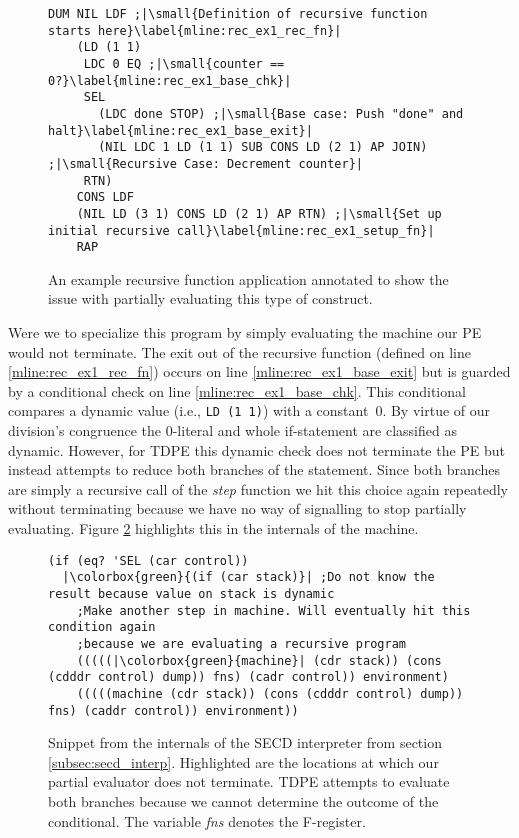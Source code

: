 \documentclass[a4paper,12pt,twoside,openright]{report}
\theoremstyle{definition}
\begin{document}
\begin{figure}[ht]
\begin{verbatim}
DUM NIL LDF ;|\small{Definition of recursive function starts here}\label{mline:rec_ex1_rec_fn}|
    (LD (1 1)
     LDC 0 EQ ;|\small{counter == 0?}\label{mline:rec_ex1_base_chk}|
     SEL
       (LDC done STOP) ;|\small{Base case: Push "done" and halt}\label{mline:rec_ex1_base_exit}|
       (NIL LDC 1 LD (1 1) SUB CONS LD (2 1) AP JOIN) ;|\small{Recursive Case: Decrement counter}|
     RTN)
    CONS LDF
    (NIL LD (3 1) CONS LD (2 1) AP RTN) ;|\small{Set up initial recursive call}\label{mline:rec_ex1_setup_fn}|
    RAP
\end{verbatim}
\caption{An example recursive function application annotated to show the issue with partially evaluating this type of construct.}
\label{lst:secd_recursion_ex1}
\end{figure}

Were we to specialize this program by simply evaluating the machine our PE would not terminate. The exit out of the recursive function (defined on line \ref{mline:rec_ex1_rec_fn}) occurs on line \ref{mline:rec_ex1_base_exit} but is guarded by a conditional check on line \ref{mline:rec_ex1_base_chk}. This conditional compares a dynamic value (i.e., \mbox{\texttt{LD (1 1)}}) with a \mbox{constant 0}. By virtue of our division's congruence the \mbox{0-literal} and whole if-statement are classified as dynamic. However, for TDPE this dynamic check does not terminate the PE but instead attempts to reduce both branches of the statement. Since both branches are simply a recursive call of the \textit{step} function we hit this choice again repeatedly without terminating because we have no way of signalling to stop partially evaluating. Figure \ref{lst:secd_recursion_machine_ex1} highlights this in the internals of the machine.

\begin{figure}[ht!]
\begin{verbatim}
(if (eq? 'SEL (car control))
  |\colorbox{green}{(if (car stack)}| ;Do not know the result because value on stack is dynamic
    ;Make another step in machine. Will eventually hit this condition again
    ;because we are evaluating a recursive program
    (((((|\colorbox{green}{machine}| (cdr stack)) (cons (cdddr control) dump)) fns) (cadr control)) environment)
    (((((machine (cdr stack)) (cons (cdddr control) dump)) fns) (caddr control)) environment))
\end{verbatim}
\caption{Snippet from the internals of the SECD interpreter from section \ref{subsec:secd_interp}. Highlighted are the locations at which our partial evaluator does not terminate. TDPE attempts to evaluate both branches because we cannot determine the outcome of the conditional. The variable \textit{fns} denotes the F-register.}
\label{lst:secd_recursion_machine_ex1}
\end{figure}
\end{document}
